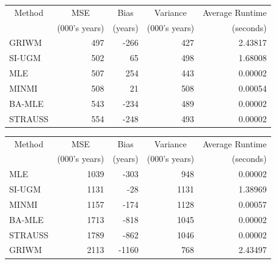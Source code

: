 \documentclass[
]{article}
\begin{document}
\begin{tabular}{lrrrr}
\toprule
\multicolumn{1}{c}{Method} & \multicolumn{1}{c}{MSE} & \multicolumn{1}{c}{Bias} & \multicolumn{1}{c}{Variance} & \multicolumn{1}{c}{Average Runtime} \\
\cmidrule(l{3pt}r{3pt}){1-1} \cmidrule(l{3pt}r{3pt}){2-2} \cmidrule(l{3pt}r{3pt}){3-3} \cmidrule(l{3pt}r{3pt}){4-4} \cmidrule(l{3pt}r{3pt}){5-5}
 & (000's years) & (years) & (000's years) & (seconds)\\
\midrule
GRIWM & 497 & -266 & 427 & 2.43817\\
SI-UGM & 502 & 65 & 498 & 1.68008\\
MLE & 507 & 254 & 443 & 0.00002\\
MINMI & 508 & 21 & 508 & 0.00054\\
BA-MLE & 543 & -234 & 489 & 0.00002\\
\addlinespace
STRAUSS & 554 & -248 & 493 & 0.00002\\
\bottomrule
\end{tabular}

\begin{tabular}{lrrrr}
\toprule
\multicolumn{1}{c}{Method} & \multicolumn{1}{c}{MSE} & \multicolumn{1}{c}{Bias} & \multicolumn{1}{c}{Variance} & \multicolumn{1}{c}{Average Runtime} \\
\cmidrule(l{3pt}r{3pt}){1-1} \cmidrule(l{3pt}r{3pt}){2-2} \cmidrule(l{3pt}r{3pt}){3-3} \cmidrule(l{3pt}r{3pt}){4-4} \cmidrule(l{3pt}r{3pt}){5-5}
 & (000's years) & (years) & (000's years) & (seconds)\\
\midrule
MLE & 1039 & -303 & 948 & 0.00002\\
SI-UGM & 1131 & -28 & 1131 & 1.38969\\
MINMI & 1157 & -174 & 1128 & 0.00057\\
BA-MLE & 1713 & -818 & 1045 & 0.00002\\
STRAUSS & 1789 & -862 & 1046 & 0.00002\\
\addlinespace
GRIWM & 2113 & -1160 & 768 & 2.43497\\
\bottomrule
\end{tabular}
\end{document}
